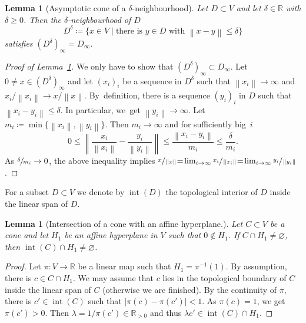 \documentclass[11pt]{article}
\numberwithin{equation}{section}
\theoremstyle{plain}
\newtheorem{lemma}[theorem]{Lemma}
\theoremstyle{definition}
\DeclareMathOperator{\inter}{int}
\newcommand{\norm}[1]{\left\lVert#1\right\rVert}
\newcommand{\RR}{\mathbb{R}}
\newcommand{\set}[2]{\{#1 \mid #2\}}
\begin{document}
\begin{lemma}[Asymptotic cone of a $\delta$-neighbourhood]
\label{lem.Asymptotic_cone_delt_neighb}
Let $D \subset V$ and let $\delta \in \RR$ with $\delta \geq 0$. Then
the $\delta$-neighbourhood of $D$
\[
D^{\delta} \coloneqq \set{x \in V}{\textrm{there is $y \in D$ with $\norm{x-y} \leq \delta$}}
\]
satisfies $(D^{\delta})_{\infty} = D_{\infty}$.
\end{lemma}

\begin{proof}[Proof of Lemma~\ref{lem.Asymptotic_cone_delt_neighb}]
We only have to show that $(D^{\delta})_{\infty} \subset D_{\infty}$. Let
$0 \neq x \in (D^{\delta})_{\infty}$ and let
$(x_i)_i$ be a sequence
in $D^{\delta}$ such that $\norm{x_i} \to \infty$ and $x_i / \norm{x_i} \to x / \norm{x}$.
By~definition,
there is a sequence $(y_i)_i$ in $D$ such that $\norm{x_i-y_i} \leq \delta$. In particular, we~get
$\norm{y_i} \to \infty$. Let $m_i \coloneqq \min\{\norm{x_i}, \norm{y_i}\}$. Then $m_i \to \infty$
and for sufficiently big~$i$
\[
0 \leq \norm{\frac{x_i}{\norm{x_i}}-\frac{y_i}{\norm{y_i}}} \leq \frac{\norm{x_i-y_i}}{m_i} \leq \frac{\delta}{m_i}.
\]
As $\sfrac{\delta}{m_i} \to 0$, the above inequality
implies
$\sfrac{x}{\norm{x}}\!=\!\lim_{i \to \infty} \sfrac{x_i}{\norm{x_i}}\!=\!\lim_{i \to \infty} \sfrac{y_i}{\norm{y_i}}$.
\end{proof}

For a subset $D \subset V$ we denote by $\inter(D)$ the topological interior
of $D$ inside the linear span of $D$.

\begin{lemma}[Intersection of a cone with an affine hyperplane.]
\label{lem.Intersection_with_affine_hyperplane}
Let $C \subset V$ be a cone and let $H_1$ be an affine hyperplane in $V$
such that $0 \not\in H_1$. If $C \cap H_1 \neq \varnothing$, then $\inter(C) \cap H_1 \neq \varnothing$.
\end{lemma}

\begin{proof}
Let $\pi \colon V \to \RR$ be a linear map such that $H_1 = \pi^{-1}(1)$.
By assumption, there is $c \in C \cap H_1$.
We may assume that $c$ lies in the topological boundary of $C$ inside the linear span of $C$
(otherwise we are finished).
By the continuity
of $\pi$, there is $c' \in \inter(C)$ such that $|\pi(c)- \pi(c')| < 1$. As $\pi(c) = 1$, we
get $\pi(c') > 0$. Then $\lambda = 1 / \pi(c') \in \RR_{> 0}$ and thus
$\lambda c' \in \inter(C) \cap H_1$.
\end{proof}
\end{document}
